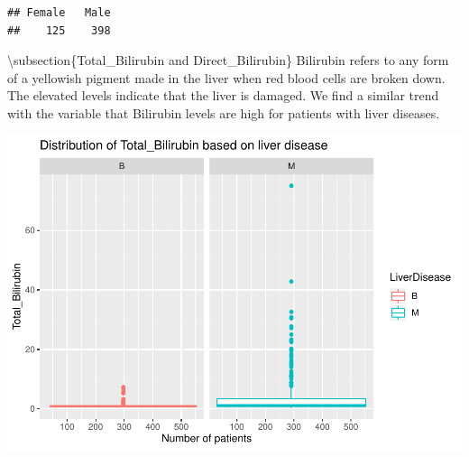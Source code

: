 \documentclass[]{article}
\newenvironment{Shaded}{\begin{snugshade}}{\end{snugshade}}
\newcommand{\CommentTok}[1]{\textcolor[rgb]{0.56,0.35,0.01}{\textit{#1}}}
\newcommand{\DataTypeTok}[1]{\textcolor[rgb]{0.13,0.29,0.53}{#1}}
\newcommand{\KeywordTok}[1]{\textcolor[rgb]{0.13,0.29,0.53}{\textbf{#1}}}
\newcommand{\NormalTok}[1]{#1}
\newcommand{\OperatorTok}[1]{\textcolor[rgb]{0.81,0.36,0.00}{\textbf{#1}}}
\newcommand{\StringTok}[1]{\textcolor[rgb]{0.31,0.60,0.02}{#1}}
\begin{document}
\begin{verbatim}
## Female   Male 
##    125    398
\end{verbatim}

\textbackslash subsection\{Total\_Bilirubin and Direct\_Bilirubin\}
Bilirubin refers to any form of a yellowish pigment made in the liver
when red blood cells are broken down. The elevated levels indicate that
the liver is damaged. We find a similar trend with the variable that
Bilirubin levels are high for patients with liver diseases.

\begin{Shaded}
\end{Shaded}

\includegraphics{LiverDisease_files/figure-latex/unnamed-chunk-12-1.pdf}
\end{document}
